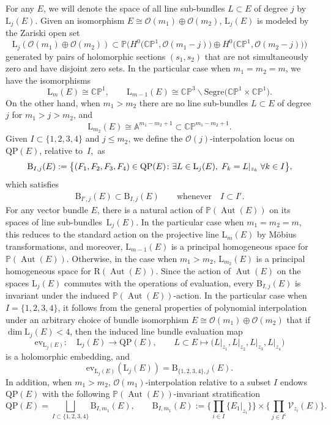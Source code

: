 \documentclass[10pt,a4paper]{amsart}
\newcommand{\field}[1]{\ensuremath{\mathbb{#1}}}
\newcommand{\CC}{\field{C}}
\newcommand{\PP}{\field{P}}
\newcommand{\calO}{\mathcal{O}}
\newcommand{\curly}[1]{\mathscr{#1}}
\newcommand{\cV}{\curly{V}}
\DeclareMathOperator{\Aut}{Aut}
\numberwithin{equation}{section}
\begin{document}
For any $E$, we will denote the space of all line sub-bundles $L\subset E$ of degree $j$ by $\mathrm{L}_{j}(E)$. Given an isomorphism $E\cong \calO(m_{1})\oplus\calO(m_{2})$, $\mathrm{L}_{j}(E)$ is modeled by the Zariski open set
\[
\mathrm{L}_{j}(\calO(m_{1})\oplus\calO(m_{2})) \subset \PP\bigl(H^{0}\big(\CC\PP^{1},\calO(m_{1}-j)\big)\oplus H^{0}\big(\CC\PP^{1},\calO(m_{2}-j)\big)\bigr)
\]
generated by pairs of holomorphic sections $(s_{1},s_{2})$ that are not simultaneously zero and have disjoint zero sets. In the particular case when $m_{1}=m_{2}=m$, we have the isomorphisms
\[
\mathrm{L}_{m}(E)\cong\CC\PP^{1},\qquad \mathrm{L}_{m-1}(E)\cong\CC\PP^{3}\backslash \mathrm{Segre}\big(\CC\PP^{1}\times\CC\PP^{1}\big).
\]
On the other hand, when $m_{1} > m_{2}$ there are no line sub-bundles $L\subset E$ of degree $j$ for $m_{1} > j > m_{2}$, and
\[
\mathrm{L}_{m_{2}}(E)\cong \mathbb{A}^{m_{1}-m_{2}+1}\subset \CC\PP^{m_{1}-m_{2}+1}.
\]
Given $I\subset\{1,2,3,4\}$ and $j\leq m_{2}$, we define the $\calO(j)$-interpolation locus on $\mathrm{QP}(E)$, relative to~$I$,~as
\begin{gather}\label{eq:B_{I,j}(E)}
\mathrm{B}_{I,j}(E) := \bigl\{(F_{1},F_{2},F_{3},F_{4})\in\mathrm{QP}(E)\colon \exists L\in\mathrm{L}_{j}(E),\; F_{k} = L\vert_{z_{k}}\; \forall k\in I \bigr\},
\end{gather}
which satisfies
\begin{gather}\label{eq:I<I'}
\mathrm{B}_{I',j}(E)\subset \mathrm{B}_{I,j}(E)\qquad \text{whenever}\quad I\subset I'.
\end{gather}
For any vector bundle $E$, there is a natural action of $\PP(\Aut(E))$ on its spaces of line sub-bund\-les~$\mathrm{L}_{j}(E)$. In the particular case when $m_{1}=m_{2}=m$, this reduces to the standard action on the projective line $\mathrm{L}_{m}(E)$ by M\"obius transformations, and moreover, $\mathrm{L}_{m-1}(E)$ is a principal homogeneous space for $\PP(\Aut(E))$. Otherwise, in the case when $m_{1}>m_{2}$, $\mathrm{L}_{m_{2}}(E)$ is a principal homogeneous space for $\mathrm{R}(\Aut(E))$.
Since the action of $\Aut (E)$ on the spaces $\mathrm{L}_{j}(E)$ commutes with the operations of evaluation, every $\mathrm{B}_{I,j}(E)$ is invariant under the induced $\PP(\Aut(E))$-action. In the particular case when $I=\{1,2,3,4\}$, it follows from the general properties of polynomial interpolation under an arbitrary choice of bundle isomorphism $E\cong \calO(m_{1})\oplus\calO(m_{2})$ that if $\dim \mathrm{L}_{j}(E)<4$, then the induced line bundle evaluation map
\[
\mathrm{ev}_{\mathrm{L}_{j}(E)}\colon\quad \mathrm{L}_{j}(E)\rightarrow \mathrm{QP}(E),\qquad L\subset E\mapsto \bigl(L\vert_{z_{1}},L\vert_{z_{2}},L\vert_{z_{3}},L\vert_{z_{4}}\bigr)
\]
is a holomorphic embedding, and
\[
\mathrm{ev}_{\mathrm{L}_{j}(E)}(\mathrm{L}_{j}(E)) = \mathrm{B}_{\{1,2,3,4\},j}(E).
\]
In addition, when $m_{1} > m_{2}$, $\calO(m_{1})$-interpolation relative to a subset $I$ endows $\mathrm{QP}(E)$ with the following $\PP(\Aut(E))$-invariant stratification
\[
\mathrm{QP}(E) = \bigsqcup_{I\subset\{1,2,3,4\}}\mathrm{B}_{I,m_{1}}(E),\qquad
\mathrm{B}_{I,m_{1}}(E) := \bigg\{\prod_{i\in I}\{E_{1}\vert_{z_{i}}\} \bigg\} \times \bigg\{\prod_{j\in I^{\mathsf{c}}}\cV_{z_{i}}(E) \bigg\}.
\]
\end{document}
